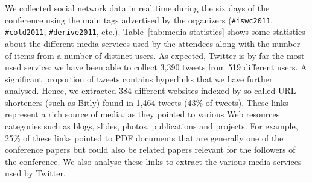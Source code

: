 We collected social network data in real time during the six days of the conference using the main tags advertised by the organizers (\texttt{\#iswc2011}, \texttt{\#cold2011}, \texttt{\#derive2011}, etc.). Table~\ref{tab:media-statistics} shows some statistics about the different media services used by the attendees along with the number of items from a number of distinct users. As expected, Twitter is by far the most used service: we have been able to collect 3,390 tweets from 519 different users. A significant proportion of tweets contains hyperlinks that we have further analysed. Hence, we extracted 384 different websites indexed by so-called URL shorteners (such as Bitly) found in 1,464 tweets (43\% of tweets). These links represent a rich source of media, as they pointed to various Web resources categories such as blogs, slides, photos, publications and projects. For example, 25\% of these links pointed to PDF documents that are generally one of the conference papers but could also be related papers relevant for the followers of the conference. We also analyse these links to extract the various media services used by Twitter.

\begin{table}[htbp]
\end{table}

